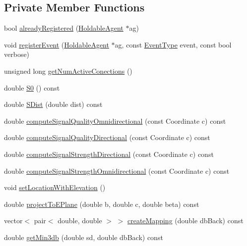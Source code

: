 \subsection*{Private Member Functions}
\begin{DoxyCompactItemize}
\item 
bool \mbox{\hyperlink{class_antenna_af4fb83843393bf36bdcaefae5b5dd0dd}{already\+Registered}} (\mbox{\hyperlink{class_holdable_agent}{Holdable\+Agent}} $\ast$ag)
\item 
void \mbox{\hyperlink{class_antenna_aa21a4c0d581c59c36480d932584c0ef5}{register\+Event}} (\mbox{\hyperlink{class_holdable_agent}{Holdable\+Agent}} $\ast$ag, const \mbox{\hyperlink{_event_type_8h_a2628ea8d12e8b2563c32f05dc7fff6fa}{Event\+Type}} event, const bool verbose)
\item 
unsigned long \mbox{\hyperlink{class_antenna_a86c5c094ab6ea432609afa00f3a8080a}{get\+Num\+Active\+Conections}} ()
\item 
double \mbox{\hyperlink{class_antenna_a033246c50bec80123860154a949620c7}{S0}} () const
\item 
double \mbox{\hyperlink{class_antenna_ae60ab40ded94be407c3b7455f4e886fe}{S\+Dist}} (double dist) const
\item 
double \mbox{\hyperlink{class_antenna_a036e212fda08a9fc5215732378fc4fbd}{compute\+Signal\+Quality\+Omnidirectional}} (const Coordinate c) const
\item 
double \mbox{\hyperlink{class_antenna_a0bba3b0a586d5dc36397c2b9887cd42b}{compute\+Signal\+Quality\+Directional}} (const Coordinate c) const
\item 
double \mbox{\hyperlink{class_antenna_a38bb70c5ca249773512186c34792b43a}{compute\+Signal\+Strength\+Directional}} (const Coordinate c) const
\item 
double \mbox{\hyperlink{class_antenna_a26077f4061413733cedf9253ecc8686f}{compute\+Signal\+Strength\+Omnidirectional}} (const Coordinate c) const
\item 
void \mbox{\hyperlink{class_antenna_a4b1d0ae147826e553a044fd481d6c7e0}{set\+Location\+With\+Elevation}} ()
\item 
double \mbox{\hyperlink{class_antenna_a298c80a54828c8f13d584e8e382145a5}{project\+To\+E\+Plane}} (double b, double c, double beta) const
\item 
vector$<$ pair$<$ double, double $>$ $>$ \mbox{\hyperlink{class_antenna_afe86e36673d4b28713f983cc63d89e1b}{create\+Mapping}} (double db\+Back) const
\item 
double \mbox{\hyperlink{class_antenna_a1c6126c232ee496b9b693fc20e4892f5}{get\+Min3db}} (double sd, double db\+Back) const

\end{DoxyCompactItemize}
